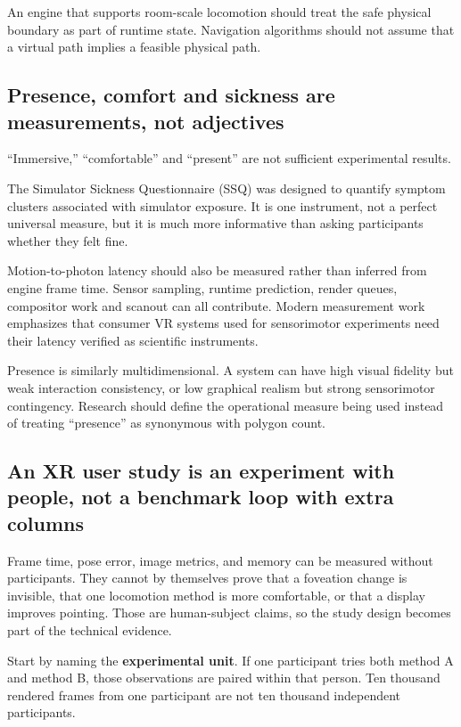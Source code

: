 An engine that supports room-scale locomotion should treat the safe physical boundary as part of runtime state. Navigation algorithms should not assume that a virtual path implies a feasible physical path.

\subsection{Presence, comfort and sickness are measurements, not adjectives}\label{presence-comfort-and-sickness-are-measurements-not-adjectives}

``Immersive,'' ``comfortable'' and ``present'' are not sufficient experimental results.

The Simulator Sickness Questionnaire (SSQ) was designed to quantify symptom clusters associated with simulator exposure. It is one instrument, not a perfect universal measure, but it is much more informative than asking participants whether they felt fine.

Motion-to-photon latency should also be measured rather than inferred from engine frame time. Sensor sampling, runtime prediction, render queues, compositor work and scanout can all contribute. Modern measurement work emphasizes that consumer VR systems used for sensorimotor experiments need their latency verified as scientific instruments.

Presence is similarly multidimensional. A system can have high visual fidelity but weak interaction consistency, or low graphical realism but strong sensorimotor contingency. Research should define the operational measure being used instead of treating ``presence'' as synonymous with polygon count.

\subsection{An XR user study is an experiment with people, not a benchmark loop with extra columns}\label{an-xr-user-study-is-an-experiment-with-people-not-a-benchmark-loop-with-extra-columns}

Frame time, pose error, image metrics, and memory can be measured without participants. They cannot by themselves prove that a foveation change is invisible, that one locomotion method is more comfortable, or that a display improves pointing. Those are human-subject claims, so the study design becomes part of the technical evidence.

Start by naming the \textbf{experimental unit}. If one participant tries both method A and method B, those observations are paired within that person. Ten thousand rendered frames from one participant are not ten thousand independent participants.

